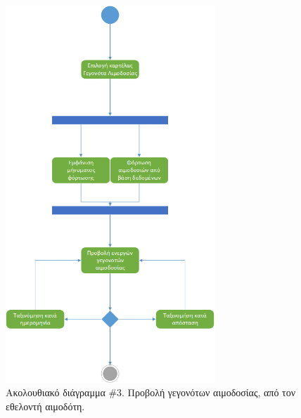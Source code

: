 		\begin{figure}[H]
		    \centering
		    \includegraphics[width=0.7\textwidth]{ViewDonationEvents.png}
		    \caption{Ακολουθιακό διάγραμμα \#3. Προβολή γεγονότων αιμοδοσίας, από τον εθελοντή αιμοδότη.}
		    \label{fig:view}
		\end{figure}
		
